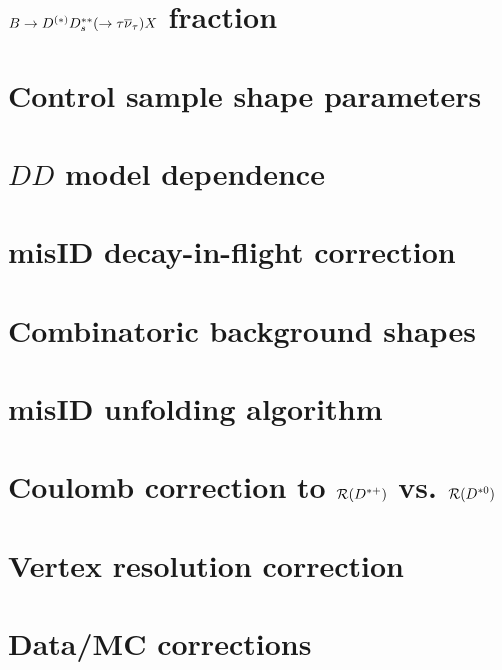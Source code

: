 \section{$B \rightarrow D^{(*)} D^{**}_s (\rightarrow \tau{\ensuremath{{\overline{\nu}}_\tau}}) X$ fraction}
\label{sys-tau-ddx}


\section{Control sample shape parameters}
\label{sys-model-ctrl}


\section{$DD$ model dependence}
\label{sys-model-ddx}


\section{\muon misID decay-in-flight correction}
\label{sys-model-dif}


\section{Combinatoric background shapes}
\label{sys-model-comb}


\section{\muon misID unfolding algorithm}
\label{sys-algo-misid}


\section{Coulomb correction to $\mathcal{R}({{D}^{*+}})$ vs. $\mathcal{R}({{D}^{*0}})$}
\label{sys-theory-coulomb}


\section{Vertex resolution correction}
\label{sys-cor-vtx}


\section{Data/MC corrections}
\label{sys-cor-rwt}
